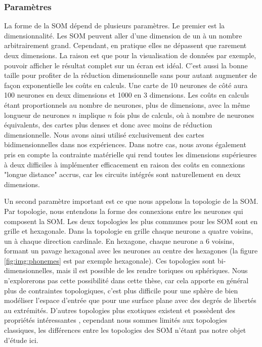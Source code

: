 \subsubsection{Paramètres}\label{param_som}

	La forme de la SOM dépend de plusieurs paramètres. Le premier est la dimensionnalité. Les SOM peuvent aller d'une dimension de un à un nombre arbitrairement grand. Cependant, en pratique elles ne dépassent que rarement deux dimensions. La raison est que pour la visualisation de données par exemple, pouvoir afficher le résultat complet sur un écran est idéal. C'est aussi la bonne taille pour profiter de la réduction dimensionnelle sans pour autant augmenter de façon exponentielle les coûts en calculs. Une carte de 10 neurones de côté aura 100 neurones en deux dimensions et 1000 en 3 dimensions. Les coûts en calculs étant proportionnels au nombre de neurones, plus de dimensions, avec la même longueur de neurones $n$ implique $n$ fois plus de calculs, où à nombre de neurones équivalents, des cartes plus denses et donc avec moins de réduction dimensionnelle. Nous avons ainsi utilisé exclusivement des cartes bidimensionnelles dans nos expériences. Dans notre cas, nous avons également pris en compte la contrainte matérielle qui rend toutes les dimensions supérieures à deux difficiles à implémenter efficacement en raison des coûts en connexions "longue distance" accrus, car les circuits intégrés sont naturellement en deux dimensions.
	
	Un second paramètre important est ce que nous appelons la topologie de la SOM. Par topologie, nous entendons la forme des connexions entre les neurones qui composent la SOM. Les deux topologies les plus communes pour les SOM sont en grille et hexagonale. Dans la topologie en grille chaque neurone a quatre voisins, un à chaque direction cardinale. En hexagone, chaque neurone a 6 voisins, formant un pavage hexagonal avec les neurones au centre des hexagones (la figure \ref{fig:img:phonemes} est par exemple hexagonale). Ces topologies sont bi-dimensionnelles, mais il est possible de les rendre toriques ou sphériques. Nous n'explorerons pas cette possibilité dans cette thèse, car cela apporte en général plus de contraintes topologiques, c'est plus difficile pour une sphère de bien modéliser l'espace d'entrée que pour une surface plane avec des degrés de libertés au extrémités. D'autres topologies plus exotiques existent et possèdent des propriétés intéressantes \cite{bernard2018np}, cependant nous sommes limités aux topologies classiques, les différences entre les topologies des SOM n'étant pas notre objet d'étude ici.

